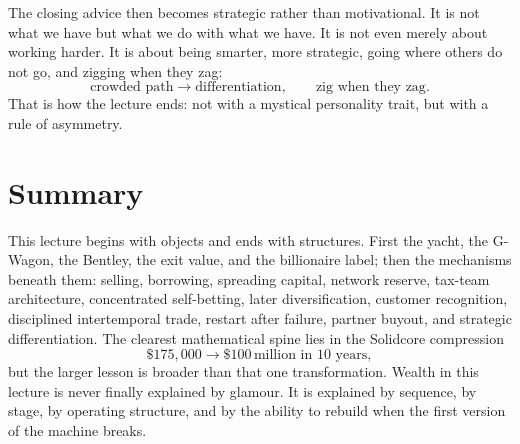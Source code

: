 The closing advice then becomes strategic rather than motivational. It is not what we have but what we do with what we have. It is not even merely about working harder. It is about being smarter, more strategic, going where others do not go, and zigging when they zag:
\begin{equation}
\text{crowded path} \to \text{differentiation},
\qquad
\text{zig when they zag}.
\end{equation}
That is how the lecture ends: not with a mystical personality trait, but with a rule of asymmetry.

\section{Summary}

This lecture begins with objects and ends with structures. First the yacht, the G-Wagon, the Bentley, the exit value, and the billionaire label; then the mechanisms beneath them: selling, borrowing, spreading capital, network reserve, tax-team architecture, concentrated self-betting, later diversification, customer recognition, disciplined intertemporal trade, restart after failure, partner buyout, and strategic differentiation. The clearest mathematical spine lies in the Solidcore compression
\[
\$175{,}000 \to \$100\,\text{million in 10 years},
\]
but the larger lesson is broader than that one transformation. Wealth in this lecture is never finally explained by glamour. It is explained by sequence, by stage, by operating structure, and by the ability to rebuild when the first version of the machine breaks.